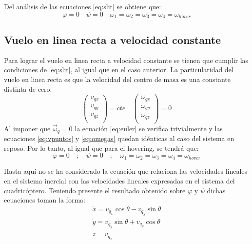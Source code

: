 \documentclass[main]{subfiles}
\begin{document}
Del an\'alisis de las ecuaciones \ref{eq:slit} se obtiene que:
\begin{equation}
\varphi=0 \quad \psi=0 \quad \omega_1=\omega_2=\omega_3=\omega_4=\omega_{hover}
\end{equation}


\subsection{Vuelo en linea recta a velocidad constante}

Para lograr el vuelo en linea recta a velocidad constante se tienen que cumplir las condiciones de \ref{eq:slit}, al igual que en el caso anterior. La particularidad del vuelo en linea recta es que la velocidad del centro de masa es una constante distinta de cero. 
\begin{equation}
\label{eq:recta}
\left(\begin{array}{c}
v_{qx}\\
v_{qy}\\
v_{qz}\\
\end{array}\right)=cte \quad
\left(\begin{array}{c}
\omega_{qx}\\
\omega_{qy}\\
\omega_{qz}\\
\end{array}\right)=0
\end{equation}
Al imponer que $\vec{\omega}_q=0$ la ecuaci\'on \ref{eq:euler} se verifica trivialmente y las ecuaciones \ref{eq:vpuntos} y \ref{eq:omegas} quedan id\'enticas al caso del sistema en reposo. Por lo tanto, al igual que para el hovering, se tendr\'a que:
\begin{equation}
\varphi=0 \quad ; \quad \psi=0 \quad ; \quad \omega_1=\omega_2=\omega_3=\omega_4 = \omega_{hover}
\end{equation}

Hasta aqu\'i no se ha considerado la ecuaci\'on que relaciona las velocidades lineales en el sistema inercial con las velocidades lineales expresadas en el sistema del cuadric\'optero. Teniendo presente el resultado obtenido sobre $\varphi$ y $\psi$ dichas ecuaciones toman la forma:
\begin{equation}\begin{array}{c}
\dot{x}=v_{q_x}\cos\theta-v_{q_y}\sin\theta\\
\dot{y}=v_{q_y}\sin\theta+v_{q_y}\cos\theta\\
\dot{z}=v_{q_z}
\end{array}
\end{equation} 
\end{document}

